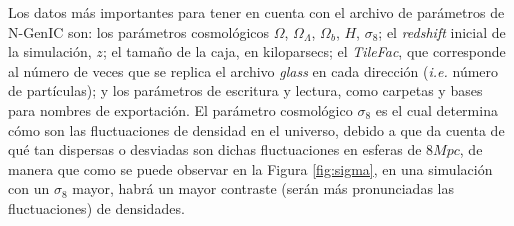 Los datos más importantes para tener en cuenta con el archivo de parámetros de N-GenIC son: los parámetros cosmológicos $\Omega$, $\Omega_\Lambda$, $\Omega_b$, $H$, $\sigma_8$; el \textit{redshift} inicial de la simulación, $z$; el tamaño de la caja, en kiloparsecs; el \textit{TileFac}, que corresponde al número de veces que se replica el archivo \textit{glass} en cada dirección (\textit{i.e.} número de partículas); y los parámetros de escritura y lectura, como carpetas y bases para nombres de exportación. El parámetro cosmológico $\sigma_8$ es el cual determina cómo son las fluctuaciones de densidad en el universo, debido a que da cuenta de qué tan dispersas o desviadas son dichas fluctuaciones en esferas de $8Mpc$, de manera que como se puede observar en la Figura \ref{fig:sigma}, en una simulación con un $\sigma_8$ mayor, habrá un mayor contraste (serán más pronunciadas las fluctuaciones) de densidades. 

